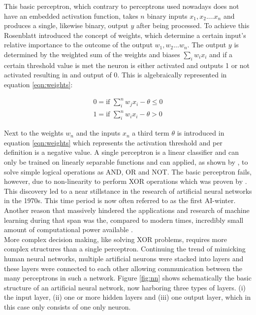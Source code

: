 This basic perceptron, which contrary to perceptrons used nowadays does not have an embedded activation
function, takes $n$ binary inputs $x_1 , x_2 .... x_n$ and produces a single, likewise binary, output $y$
after being processed. To achieve this Rosenblatt introduced the concept of weights, which determine a certain
input's relative importance to the outcome of the output $w_1 , w_2 ... w_n$. The output $y$ is determined by
the weighted sum of the weights and biases $\sum_i w_ix_i $ and if a certain threshold value is met the
neuron is either activated and outputs 1 or not activated resulting in and output of 0. This is algebraically
represented in equation \ref{eqn:weights}:

\begin{subequations}
 \begin{align}
  0 = \mbox{if } \sum_i^n w_j x_i - \theta \leq 0 \\
  1 = \mbox{if } \sum_i^n w_i x_i - \theta > 0
 \end{align}
 \label{eqn:weights}
\end{subequations}


Next to the weights $w_n$ and the inputs $x_n$ a third term $\theta$ is introduced in equation
\ref{eqn:weights} which represents the activation threshold and per definition is a negative value. A single
perceptron is a linear classifier and can only be trained on linearly separable functions and can applied, as
shown by \cite{rosenblatt1961}, to solve simple logical operations as AND, OR and NOT. The basic perceptron
fails, however, due to non-linearity to perform XOR operations which was proven by \cite{marvin1969}. This
discovery led to a near stillstance in the research of artificial neural networks in the 1970s. This time
period is now often referred to as the first AI-winter. Another reason that massively hindered the
applications and research of machine learning during that span was the, compared to
modern times, incredibly small amount of computational power available \cite{nguyen1990truck}. \\
More complex decision making, like solving XOR problems, requires more complex structures than a single
perceptron. Continuing the trend of mimicking human neural networks, multiple artificial neurons were stacked
into layers and these layers were connected to each other allowing communication between the many perceptrons
in such a network. Figure \ref{fig:nn} shows schematically the basic structure of an artificial neural
network, now harboring three types of layers. (i) the input layer, (ii) one or more hidden layers and (iii)
one output layer, which in this case only consists of one only neuron.

